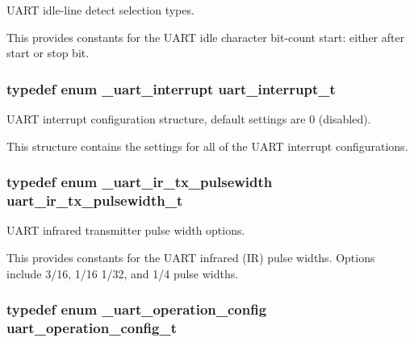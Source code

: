 U\+A\+RT idle-\/line detect selection types. 

This provides constants for the U\+A\+RT idle character bit-\/count start\+: either after start or stop bit. 
\subsubsection[{\texorpdfstring{uart\+\_\+interrupt\+\_\+t}{uart_interrupt_t}}]{\setlength{\rightskip}{0pt plus 5cm}typedef enum {\bf \+\_\+uart\+\_\+interrupt}  {\bf uart\+\_\+interrupt\+\_\+t}}\hypertarget{group__uart__hal_ga8e2791d1785e2c0036663b1e1be51a14}{}\label{group__uart__hal_ga8e2791d1785e2c0036663b1e1be51a14}


U\+A\+RT interrupt configuration structure, default settings are 0 (disabled). 

This structure contains the settings for all of the U\+A\+RT interrupt configurations. 
\subsubsection[{\texorpdfstring{uart\+\_\+ir\+\_\+tx\+\_\+pulsewidth\+\_\+t}{uart_ir_tx_pulsewidth_t}}]{\setlength{\rightskip}{0pt plus 5cm}typedef enum {\bf \+\_\+uart\+\_\+ir\+\_\+tx\+\_\+pulsewidth}  {\bf uart\+\_\+ir\+\_\+tx\+\_\+pulsewidth\+\_\+t}}\hypertarget{group__uart__hal_ga07f48dd4b36c6a6e57138108697fbbd9}{}\label{group__uart__hal_ga07f48dd4b36c6a6e57138108697fbbd9}


U\+A\+RT infrared transmitter pulse width options. 

This provides constants for the U\+A\+RT infrared (IR) pulse widths. Options include 3/16, 1/16 1/32, and 1/4 pulse widths. 
\subsubsection[{\texorpdfstring{uart\+\_\+operation\+\_\+config\+\_\+t}{uart_operation_config_t}}]{\setlength{\rightskip}{0pt plus 5cm}typedef enum {\bf \+\_\+uart\+\_\+operation\+\_\+config}  {\bf uart\+\_\+operation\+\_\+config\+\_\+t}}\hypertarget{group__uart__hal_ga82fb646c93dcafcd9a096c816ae3d376}{}\label{group__uart__hal_ga82fb646c93dcafcd9a096c816ae3d376}


